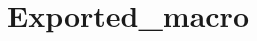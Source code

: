 \hypertarget{group___exported__macro}{\section{Exported\-\_\-macro}
\label{group___exported__macro}
}
